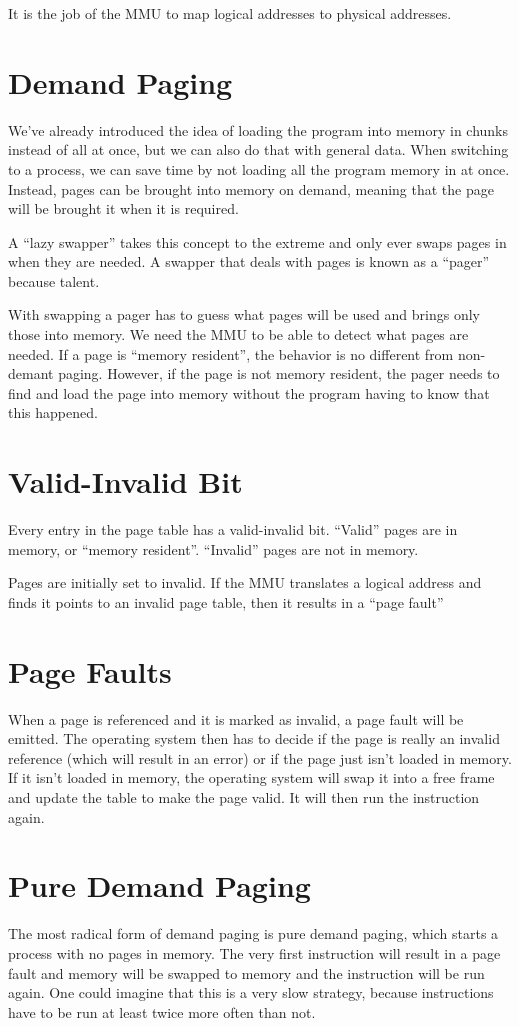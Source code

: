 \documentclass{article}
\begin{document}
It is the job of the MMU to map logical addresses to physical addresses.

\section{Demand Paging}
We've already introduced the idea of loading the program into memory in chunks
instead of all at once, but we can also do that with general data. When
switching to a process, we can save time by not loading all the program memory
in at once. Instead, pages can be brought into memory on demand, meaning that
the page will be brought it when it is required.

A ``lazy swapper'' takes this concept to the extreme and only ever swaps pages
in when they are needed. A swapper that deals with pages is known as a
``pager'' because talent.

With swapping a pager has to guess what pages will be used and brings only
those into memory. We need the MMU to be able to detect what pages are needed.
If a page is ``memory resident'', the behavior is no different from non-
demant paging. However, if the page is not memory resident, the pager needs
to find and load the page into memory without the program having to know that
this happened.

\section{Valid-Invalid Bit}
Every entry in the page table has a valid-invalid bit. ``Valid'' pages are
in memory, or ``memory resident''. ``Invalid'' pages are not in memory.

Pages are initially set to invalid. If the MMU translates a logical address
and finds it points to an invalid page table, then it results in a ``page
fault''

\section{Page Faults}
When a page is referenced and it is marked as invalid, a page fault will be
emitted. The operating system then has to decide if the page is really an
invalid reference (which will result in an error) or if the page just isn't
loaded in memory. If it isn't loaded in memory, the operating system will swap
it into a free frame and update the table to make the page valid. It will
then run the instruction again.

\section{Pure Demand Paging}
The most radical form of demand paging is pure demand paging, which starts a
process with no pages in memory. The very first instruction will result in a
page fault and memory will be swapped to memory and the instruction will be
run again. One could imagine that this is a very slow strategy, because
instructions have to be run at least twice more often than not.
\end{document}
